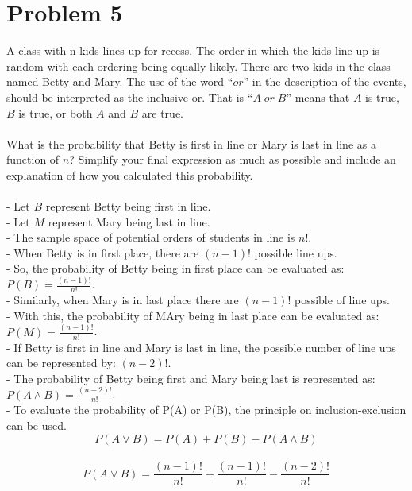 \documentclass{amsart}
\theoremstyle{definition}
\theoremstyle{Exercise}
\theoremstyle{remark}
\theoremstyle{rule}
\numberwithin{equation}{section}
\begin{document}
  \section*{}
  \section*{Problem 5}
  A class with n kids lines up for recess. The order in which the kids line up is random with each ordering being equally likely. There are two kids in the class named Betty and Mary. The use of the word ``$or$'' in the description of the events, should be interpreted as the inclusive or. That is ``$A \;or\; B$'' means that $A$ is true, $B$ is true, or both $A$ and $B$ are true.\\\\
  What is the probability that Betty is first in line or Mary is last in line as a function of $n$? Simplify your final expression as much as possible and include an explanation of how you calculated this probability.
\\\\
  - Let $B$ represent Betty being first in line.\\
  - Let $M$ represent Mary being last in line.\\
  - The sample space of potential orders of students in line is $n!$.\\
  - When Betty is in first place, there are $(n-1)!$ possible line ups.\\
  - So, the probability of Betty being in first place can be evaluated as: $P(B)=\frac{(n-1)!}{n!}$.\\
  - Similarly, when Mary is in last place there are $(n-1)!$ possible of line ups.\\
  - With this, the probability of MAry being in last place can be evaluated as: $P(M)=\frac{(n-1)!}{n!}$.\\
  - If Betty is first in line and Mary is last in line, the possible number of line ups can be represented by: $(n-2)!$.\\
  - The probability of Betty being first and Mary being last is represented as: $P(A \land B) = \frac{(n-2)!}{n!}$.\\
  - To evaluate the probability of P(A) or P(B), the principle on inclusion-exclusion can be used.\\
  $$P(A \lor B) = P(A) + P(B) - P(A \land B)$$\\
  $$P(A \lor B) = \frac{(n-1)!}{n!} + \frac{(n-1)!}{n!} - \frac{(n-2)!}{n!}$$\\
\end{document}
